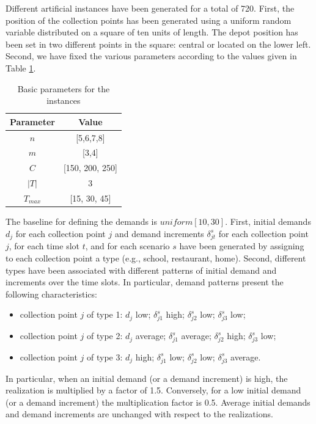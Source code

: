 \documentclass[preprint,11pt,authoryear]{elsarticle}
\begin{document}
Different artificial instances have been generated for a total of 720. First, the position of the collection points has been generated using a uniform random variable distributed on a square of ten units of length. The depot position has been set in two different points in the square: central or located on the lower left.   
%
Second, we have fixed the various parameters according to the values given in Table \ref{tab:IS2}.

\begin{table}[H]
    \centering
    \begin{tabular}{cc}
        \hline
        Parameter & Value \\
        \hline
        $n$     & [5,6,7,8] \\
        $m$     &	[3,4] \\
        $C$	    & [150, 200, 250] \\
        $|T|$	&  3  \\
        $T_{max}$  &	[15, 30, 45] \\
        \hline
    \end{tabular}
    \caption{Basic parameters for the instances}
    \label{tab:IS2}
\end{table}

The baseline for defining the demands is $uniform[10,30]$. First, initial demands $d_j$ for each collection point $j$ and demand increments $\delta^s_{jt}$ for each collection point $j$, for each time slot $t$, and for each scenario $s$ have been generated by assigning to each collection point a type (e.g., school, restaurant, home). Second, different types have been associated with different patterns of initial demand and increments over the time slots. In particular, demand patterns present the following characteristics:
\begin{itemize}
    \item collection point $j$ of type 1:  $d_j$ low; $\delta_{j1}^s$ high; $\delta_{j2}^s$ low; $\delta_{j3}^s$ low;
    \item  collection point $j$ of type 2: $d_j$ average; $\delta_{j1}^s$ average; $\delta_{j2}^s$ high; $\delta_{j3}^s$ low;
    \item  collection point $j$ of type 3: $d_j$ high; $\delta_{j1}^s$ low; $\delta_{j2}^s$ low; $\delta_{j3}^s$ average.
\end{itemize}
In particular, when an initial demand (or a demand increment) is high, the realization is multiplied by a factor of 1.5. Conversely, for a low initial demand (or a demand increment) the multiplication factor is 0.5. Average initial demands and demand increments are unchanged with respect to the realizations. 
\end{document}
